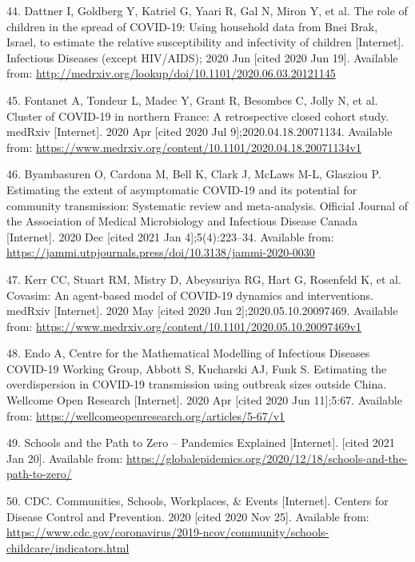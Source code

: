 \documentclass[
]{article}
\begin{document}
\leavevmode\hypertarget{ref-dattner_role_2020}{}%
44. Dattner I, Goldberg Y, Katriel G, Yaari R, Gal N, Miron Y, et al.
The role of children in the spread of COVID-19: Using household data
from Bnei Brak, Israel, to estimate the relative susceptibility and
infectivity of children {[}Internet{]}. Infectious Diseases (except
HIV/AIDS); 2020 Jun {[}cited 2020 Jun 19{]}. Available from:
\url{http://medrxiv.org/lookup/doi/10.1101/2020.06.03.20121145}

\leavevmode\hypertarget{ref-fontanet_cluster_2020}{}%
45. Fontanet A, Tondeur L, Madec Y, Grant R, Besombes C, Jolly N, et al.
Cluster of COVID-19 in northern France: A retrospective closed cohort
study. medRxiv {[}Internet{]}. 2020 Apr {[}cited 2020 Jul
9{]};2020.04.18.20071134. Available from:
\url{https://www.medrxiv.org/content/10.1101/2020.04.18.20071134v1}

\leavevmode\hypertarget{ref-byambasuren_estimating_2020}{}%
46. Byambasuren O, Cardona M, Bell K, Clark J, McLaws M-L, Glasziou P.
Estimating the extent of asymptomatic COVID-19 and its potential for
community transmission: Systematic review and meta-analysis. Official
Journal of the Association of Medical Microbiology and Infectious
Disease Canada {[}Internet{]}. 2020 Dec {[}cited 2021 Jan
4{]};5(4):223--34. Available from:
\url{https://jammi.utpjournals.press/doi/10.3138/jammi-2020-0030}

\leavevmode\hypertarget{ref-kerr_covasim_2020}{}%
47. Kerr CC, Stuart RM, Mistry D, Abeysuriya RG, Hart G, Rosenfeld K, et
al. Covasim: An agent-based model of COVID-19 dynamics and
interventions. medRxiv {[}Internet{]}. 2020 May {[}cited 2020 Jun
2{]};2020.05.10.20097469. Available from:
\url{https://www.medrxiv.org/content/10.1101/2020.05.10.20097469v1}

\leavevmode\hypertarget{ref-endo_estimating_2020}{}%
48. Endo A, Centre for the Mathematical Modelling of Infectious Diseases
COVID-19 Working Group, Abbott S, Kucharski AJ, Funk S. Estimating the
overdispersion in COVID-19 transmission using outbreak sizes outside
China. Wellcome Open Research {[}Internet{]}. 2020 Apr {[}cited 2020 Jun
11{]};5:67. Available from:
\url{https://wellcomeopenresearch.org/articles/5-67/v1}

\leavevmode\hypertarget{ref-noauthor_schools_nodate}{}%
49. Schools and the Path to Zero -- Pandemics Explained {[}Internet{]}.
{[}cited 2021 Jan 20{]}. Available from:
\url{https://globalepidemics.org/2020/12/18/schools-and-the-path-to-zero/}

\leavevmode\hypertarget{ref-cdc_communities_2020}{}%
50. CDC. Communities, Schools, Workplaces, \& Events {[}Internet{]}.
Centers for Disease Control and Prevention. 2020 {[}cited 2020 Nov
25{]}. Available from:
\url{https://www.cdc.gov/coronavirus/2019-ncov/community/schools-childcare/indicators.html}
\end{document}
